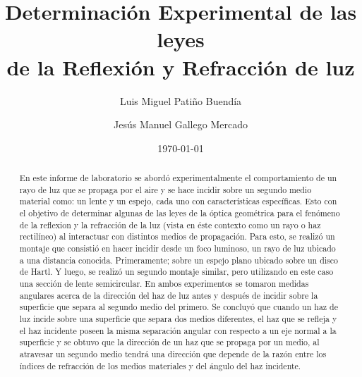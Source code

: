 \documentclass[
aps,
reprint,
amsmath, amssymb,
superscriptaddress,
]{revtex4-2}
\begin{document}

\title{Determinación Experimental de las leyes \\de la Reflexión y Refracción de luz}

\author{Luis Miguel Patiño Buendía}
\author{Jesús Manuel Gallego Mercado}




\date{\today}

\begin{abstract}
En este informe de laboratorio se abordó experimentalmente el comportamiento de un rayo de luz que se propaga por el aire y se hace incidir sobre un segundo medio material como: un lente y un espejo, cada uno con características específicas. Esto con el objetivo de determinar algunas de las leyes de la óptica geométrica para el fenómeno de la reflexion y la refracción de la luz (vista en éste contexto como un rayo o haz rectilíneo) al interactuar con distintos medios de propagación. Para esto, se realizó un montaje que consistió en hacer incidir desde un foco luminoso, un rayo de luz ubicado a una distancia conocida. Primeramente; sobre un espejo plano ubicado sobre un disco de Hartl. Y luego, se realizó un segundo montaje similar, pero utilizando en este caso una sección de lente semicircular. En ambos experimentos se tomaron medidas angulares acerca de la dirección del haz de luz antes y después de incidir sobre la superficie que separa al segundo medio del primero. Se concluyó que cuando un haz de luz incide sobre una superficie que separa dos medios diferentes, el haz que se refleja y el haz incidente poseen la misma separación angular con respecto a un eje normal a la superficie y se obtuvo que la dirección de un haz que se propaga por un medio, al atravesar un segundo medio tendrá una dirección que depende de la razón entre los índices de refracción de los medios materiales y del ángulo del haz incidente.
\end{abstract}


\maketitle
\end{document}

